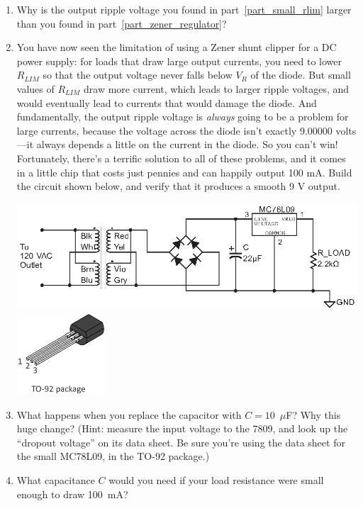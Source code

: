 \begin{enumerate}[wide]
\item Why is the output ripple voltage you found in part~\ref{part_small_rlim} larger than you found in part~\ref{part_zener_regulator}? 

\item You have now seen the limitation of using a Zener shunt clipper for a DC power supply: for loads that draw large output currents, you need to lower $R_{LIM}$ so that the output voltage never falls below $V_R$ of the diode.  But small values of $R_{LIM}$ draw more current, which leads to larger ripple voltages, and would eventually lead to currents that would damage the diode.  And fundamentally, the output ripple voltage is \textit{always} going to be a problem for large currents, because the voltage across the diode isn't exactly 9.00000 volts---it always depends a little on the current in the diode.  So you can't win!  Fortunately, there's a terrific solution to all of these problems, and it comes in a little chip that costs just pennies and can happily output 100 mA.  Build the circuit shown below, and verify that it produces a smooth 9 V output.
\begin{center}
\includegraphics{power_supply/7809_regulator.eps}
\includegraphics[width=1.3in]{appendices/pinouts/TO-92_package_pinout.eps}
\end{center}
 
\item What happens when you replace the capacitor with $C = 10$~$\mu$F?  Why this huge change?  (Hint: measure the input voltage to the 7809, and look up the ``dropout voltage'' on its data sheet.  Be sure you're using the data sheet for the small MC78L09, in the TO-92 package.)

\item What capacitance $C$ would you need if your load resistance were small enough to draw 100~mA?   


\end{enumerate}
